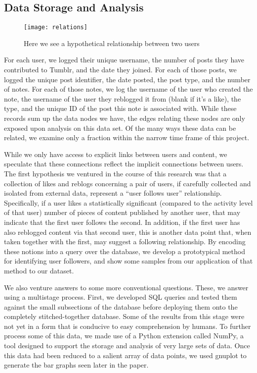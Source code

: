 \subsection{Data Storage and Analysis}
\begin{figure*}
\centering
\texttt{[image: relations]}
 \caption{Here we see a hypothetical relationship between two users}
 \label{fig:relations}
\end{figure*}
For each user, we logged their unique username, the number of posts 
they have contributed to Tumblr, and the date they joined. 
For each of those posts, we logged the unique post identifier, the 
date posted, the post type, and the number of notes.
For each of those notes, we log the username of the user who created 
the note, the username of the user they reblogged it from (blank if 
it's a like), the type, and the unique ID of the post this note is 
associated with.  While these records sum up the data nodes we have, 
the edges relating these nodes are only exposed upon analysis on this 
data set.  Of the many ways these data can be related, we examine only 
a fraction within the narrow time frame of this project.

While we only have access to explicit links between users and content, 
we speculate that these connections reflect the implicit connections 
between users.  The first hypothesis we ventured in the course of this 
research was that a collection of likes and reblogs concerning a pair 
of users, if carefully collected and isolated from external data, 
represent a ``user follows user'' relationship.  Specifically, if a 
user likes a statistically significant (compared to the activity level 
of that user) number of pieces of content published by another user, 
that may indicate that the first user follows the second.  In addition, 
if the first user has also reblogged content via that second user, this 
is another data point that, when taken together with the first, may 
suggest a following relationship.  By encoding these notions into a 
query over the database, we develop a prototypical method for 
identifying user followers, and show some samples from our application 
of that method to our dataset.


We also venture answers to some more conventional questions.  These, 
we answer using a multistage process.  First, we developed SQL queries 
and tested them against the small subsections of the database before 
deploying them onto the completely stitched-together database.  Some 
of the results from this stage were not yet in a form that is conducive 
to easy comprehension by humans.  To further process some of this data, 
we made use of a Python extension called NumPy, a tool designed to 
support the storage and analysis of very large sets of data.  Once 
this data had been reduced to a salient array of data points, we used 
gnuplot to generate the bar graphs seen later in the paper.


